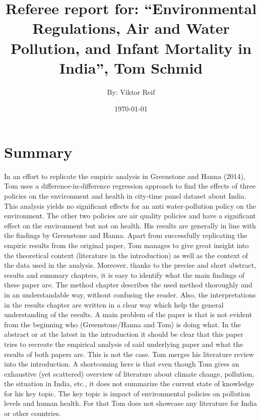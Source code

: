 \documentclass[11pt]{article}
\title{Referee report for: “Environmental Regulations, Air and Water
	Pollution, and Infant Mortality in India”, Tom Schmid}
\author{By: Viktor Reif}
\date{\today}
\begin{document}
	\maketitle
	
	


\section{Summary}
In an effort to replicate the empiric analysis in Greenstone and Hanna (2014), Tom uses a difference-in-difference regression approach to find the effects of three policies on the environment and health in city-time panel dataset about India. This analysis yields no significant effects for an anti water-pollution policy on the environment. The other two policies are air quality policies and have a significant effect on the environment but not on health. His results are generally in line with the findings by Greenstone and Hanna.
\newline Apart from successfully replicating the empiric results from the original paper, Tom manages to give great insight into the theoretical context (literature in the introduction) as well as the context of the data used in the analysis.  
Moreover, thanks to the precise and short abstract, results and summary chapters, it is easy to identify what the main findings of these paper are. 
The method chapter describes the used method thoroughly and in an understandable way, without confusing the reader. 
Also, the interpretations in the results chapter are written in a clear way which help the general understanding of the results. 
\newline A main problem of the paper is that is not evident from the beginning who (Greenstone/Hanna and Tom) is doing what. In the abstract or at the latest in the introduction it should be clear that this paper tries to recreate the empirical analysis of said underlying paper and what the results of both papers are. This is not the case. 
Tom merges his literature review into the introduction. A shortcoming here is that even though Tom gives an exhaustive (yet scattered) overview of literature about climate change, pollution, the situation in India, etc., it does not summarize the current state of knowledge for his key topic. The key topic is impact of environmental policies on pollution levels and human health. For that Tom does not showcase any literature for India or other countries. 
\end{document}
